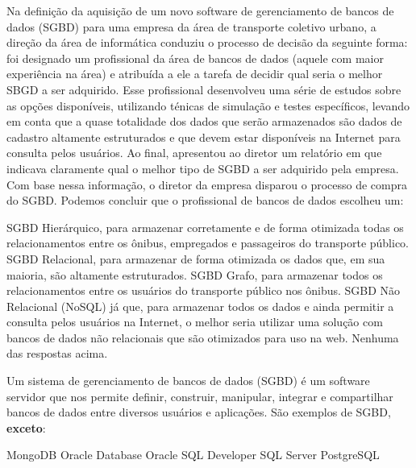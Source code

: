 \documentclass[12pt, addpoints]{exam}
\begin{document}
    \begin{questions}

    \newpage
    \question
Na definição da aquisição de um novo software de
gerenciamento de bancos de dados (SGBD) para uma empresa da área de transporte 
coletivo urbano, a direção da área de informática conduziu o processo de decisão
da seguinte forma: foi designado um profissional da área de bancos de dados
(aquele com maior experiência na área) e atribuída a ele a tarefa de decidir
qual seria o melhor SBGD a ser adquirido. Esse profissional desenvolveu uma
série de estudos sobre as opções disponíveis, utilizando ténicas de simulação e
testes específicos, levando em conta que a quase totalidade dos dados que serão
armazenados são dados de cadastro altamente estruturados e que devem estar
disponíveis na Internet para consulta pelos usuários. Ao final, apresentou
ao diretor um relatório em que indicava claramente qual o melhor tipo de SGBD a
ser adquirido pela empresa. Com base nessa informação, o diretor da empresa
disparou o processo de compra do SGBD. Podemos concluir que o profissional de
bancos de dados escolheu um:
\begin{choices}
\choice SGBD Hierárquico, para armazenar corretamente e de forma otimizada todas os relacionamentos entre os ônibus, empregados e passageiros do transporte público.
\choice SGBD Relacional, para armazenar de forma otimizada os dados que, em sua maioria, são altamente estruturados.
\choice SGBD Grafo, para armazenar todos os relacionamentos entre os usuários do transporte público nos ônibus.
\choice SGBD Não Relacional (NoSQL) já que, para armazenar todos os dados e ainda permitir a consulta pelos usuários na Internet, o melhor seria utilizar uma solução com bancos de dados não relacionais que são otimizados para uso na web.
\choice Nenhuma das respostas acima.
\end{choices}

\question
Um sistema de gerenciamento de bancos de dados (SGBD) é um software servidor
que nos permite definir, construir, manipular, integrar e compartilhar bancos
de dados entre diversos usuários e aplicações. São exemplos de
SGBD, \textbf{exceto}:
\begin{choices}
\choice MongoDB
\choice Oracle Database
\choice Oracle SQL Developer
\choice SQL Server
\choice PostgreSQL
\end{choices}


\end{questions}
\end{document}
